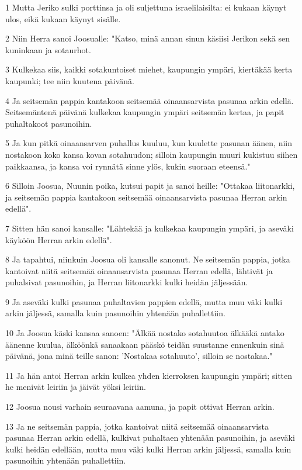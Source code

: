 \par 1 Mutta Jeriko sulki porttinsa ja oli suljettuna israelilaisilta: ei kukaan käynyt ulos, eikä kukaan käynyt sisälle.
\par 2 Niin Herra sanoi Joosualle: "Katso, minä annan sinun käsiisi Jerikon sekä sen kuninkaan ja sotaurhot.
\par 3 Kulkekaa siis, kaikki sotakuntoiset miehet, kaupungin ympäri, kiertäkää kerta kaupunki; tee niin kuutena päivänä.
\par 4 Ja seitsemän pappia kantakoon seitsemää oinaansarvista pasunaa arkin edellä. Seitsemäntenä päivänä kulkekaa kaupungin ympäri seitsemän kertaa, ja papit puhaltakoot pasunoihin.
\par 5 Ja kun pitkä oinaansarven puhallus kuuluu, kun kuulette pasunan äänen, niin nostakoon koko kansa kovan sotahuudon; silloin kaupungin muuri kukistuu siihen paikkaansa, ja kansa voi rynnätä sinne ylös, kukin suoraan eteensä."
\par 6 Silloin Joosua, Nuunin poika, kutsui papit ja sanoi heille: "Ottakaa liitonarkki, ja seitsemän pappia kantakoon seitsemää oinaansarvista pasunaa Herran arkin edellä".
\par 7 Sitten hän sanoi kansalle: "Lähtekää ja kulkekaa kaupungin ympäri, ja aseväki käyköön Herran arkin edellä".
\par 8 Ja tapahtui, niinkuin Joosua oli kansalle sanonut. Ne seitsemän pappia, jotka kantoivat niitä seitsemää oinaansarvista pasunaa Herran edellä, lähtivät ja puhalsivat pasunoihin, ja Herran liitonarkki kulki heidän jäljessään.
\par 9 Ja aseväki kulki pasunaa puhaltavien pappien edellä, mutta muu väki kulki arkin jäljessä, samalla kuin pasunoihin yhtenään puhallettiin.
\par 10 Ja Joosua käski kansaa sanoen: "Älkää nostako sotahuutoa älkääkä antako äänenne kuulua, älköönkä sanaakaan pääskö teidän suustanne ennenkuin sinä päivänä, jona minä teille sanon: 'Nostakaa sotahuuto', silloin se nostakaa."
\par 11 Ja hän antoi Herran arkin kulkea yhden kierroksen kaupungin ympäri; sitten he menivät leiriin ja jäivät yöksi leiriin.
\par 12 Joosua nousi varhain seuraavana aamuna, ja papit ottivat Herran arkin.
\par 13 Ja ne seitsemän pappia, jotka kantoivat niitä seitsemää oinaansarvista pasunaa Herran arkin edellä, kulkivat puhaltaen yhtenään pasunoihin, ja aseväki kulki heidän edellään, mutta muu väki kulki Herran arkin jäljessä, samalla kuin pasunoihin yhtenään puhallettiin.
